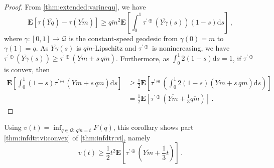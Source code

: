 \documentclass{article}
\newcommand*{\mc}[1]{\mathcal{#1}}
\newcommand{\lab}{\left[} %
\newcommand{\rab}{\right]} %
\newcommand{\ab}[1]{\lab #1 \rab} %
\newcommand{\abOf}[1]{\!\ab{#1}} %
\newcommand{\lb}{\left(} %
\newcommand{\rb}{\right)} %
\newcommand{\br}[1]{\lb #1 \rb} %
\newcommand{\brOf}[1]{\!\br{#1}} %
\newcommand{\E}{\mathbf{E}} %
\newcommand{\EOf}[1]{\E\abOf{#1}}
\newcommand{\eqcm}{\,,} %
\newcommand{\eqfs}{\,.}
\newcommand{\dl}{\mathrm{d}} %
\newcommand{\ol}[2]{\overline{#1#2}}
\newcommand{\tran}{\tau}
\newcommand{\ddrtran}{\tau^{\prime\oplus}}
\begin{document}
%
\begin{proof}
    From \cref{thm:extended:varinequ}, we have
    \begin{equation}
        \EOf{\tran(\ol Yq) - \tran(\ol Ym)} \geq \ol qm^2 \EOf{\int_{0}^{1} \ddrtran(\ol Y\gamma(s)) (1-s) \dl s}
        \eqcm
    \end{equation}
    where $\gamma \colon [0, 1] \to \mc Q$ is the constant-speed geodesic from $\gamma(0) = m$ to $\gamma(1) =q$. 
    As $\ol Y{\gamma}(s)$ is $\ol qm$-Lipschitz and $\ddrtran$ is nonincreasing, we have $\ddrtran(\ol Y\gamma(s)) \geq \ddrtran(\ol Ym + s\,\ol qm)$. Furthermore, as $\int_0^1 2(1-s)\dl s = 1$, if $\ddrtran$ is convex, then
    \begin{align}
        \EOf{\int_{0}^{1} (1-s) \ddrtran(\ol Ym + s\,\ol qm) \dl s}
        &\geq
        \frac12\EOf{\ddrtran\brOf{\int_{0}^{1} 2 (1-s) \br{\ol Ym + s\,\ol qm} \dl s}}
        \\&=
        \frac12\EOf{\ddrtran\brOf{\ol Ym + \frac13 \ol qm}}
        \eqfs
    \end{align}
\end{proof}
%
Using $v(t) = \inf_{q\in\mc Q:\,\ol qm=t}F(q)$, this corollary shows part \ref{thm:infdtr:vi:convex} of \cref{thm:infdtr:vi}, namely
 \begin{equation}
    v(t) \geq \frac12 t^2 \EOf{\ddrtran\brOf{\ol Ym + \frac13 t}}
    \eqfs
\end{equation}
%
\end{document}
